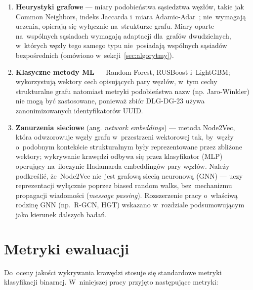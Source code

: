\documentclass[polish,master,a4paper,oneside]{ppfcmthesis}
\begin{document}
\begin{enumerate}
  \item \textbf{Heurystyki grafowe} — miary podobieństwa sąsiedztwa węzłów,
        takie jak Common Neighbors, indeks Jaccarda i~miara Adamic-Adar~\cite{LibenNowell2007};
        nie~wymagają uczenia, opierają się wyłącznie na~strukturze grafu.
        Miary oparte na~wspólnych sąsiadach wymagają adaptacji dla~grafów
        dwudzielnych, w~których węzły tego samego typu nie~posiadają
        wspólnych sąsiadów bezpośrednich (omówiono w~sekcji~\ref{sec:algorytmy}).
  \item \textbf{Klasyczne metody ML} — Random Forest, RUSBoost i~LightGBM;
        wykorzystują wektory cech opisujących pary węzłów,
        w~tym cechy strukturalne grafu natomiast metryki podobieństwa nazw (np. Jaro-Winkler) 
        nie mogą być zastosowane, ponieważ zbiór DLG-DG-23 używa zanonimizowanych 
        identyfikatorów UUID.
  \item \textbf{Zanurzenia sieciowe} (ang. \emph{network embeddings})
        — metoda Node2Vec, która odwzorowuje węzły grafu w~przestrzeni
        wektorowej tak, by~węzły o~podobnym kontekście strukturalnym były
        reprezentowane przez zbliżone wektory; wykrywanie krawędzi odbywa się
        przez klasyfikator (MLP) operujący na~iloczynie Hadamarda
        embeddingów pary węzłów. Należy podkreślić, że~Node2Vec nie~jest
        grafową siecią neuronową (GNN) — uczy reprezentacji wyłącznie
        poprzez biased random walks, bez~mechanizmu propagacji wiadomości
        (\emph{message passing}). Rozszerzenie pracy o~właściwą rodzinę GNN
        (np.~R-GCN, HGT) wskazano w~rozdziale podsumowującym jako kierunek
        dalszych badań.
\end{enumerate}


\section{Metryki ewaluacji}
\label{sec:metryki}

Do~oceny jakości wykrywania krawędzi stosuje się standardowe metryki
klasyfikacji binarnej. W~niniejszej pracy przyjęto następujące metryki:
\end{document}
